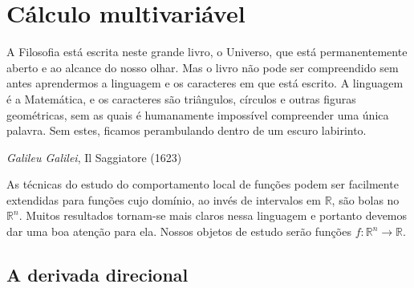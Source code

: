 \section{Cálculo multivariável}

\epigraph{\justifying A Filosofia está escrita neste grande livro, o Universo,
que está permanentemente aberto e ao alcance do nosso olhar. Mas o livro não
pode ser compreendido sem antes aprendermos a linguagem e os caracteres em que
está escrito. A linguagem é a Matemática, e os caracteres são triângulos, 
círculos e outras figuras geométricas, sem as quais é humanamente impossível
compreender uma única palavra. Sem estes, ficamos perambulando dentro de um
escuro labirinto.} {\emph{Galileu Galilei}, Il Saggiatore (1623)}

\noindent As técnicas do estudo do comportamento local de funções podem ser
facilmente extendidas para funções cujo domínio, ao invés de intervalos em
$\mathbb R$, são bolas no $\mathbb R^n$. Muitos resultados tornam-se mais claros
nessa linguagem e portanto devemos dar uma boa atenção para ela. Nossos objetos
de estudo serão funções $f:\mathbb R^n\rightarrow\mathbb R$.

\subsection{A derivada direcional}

